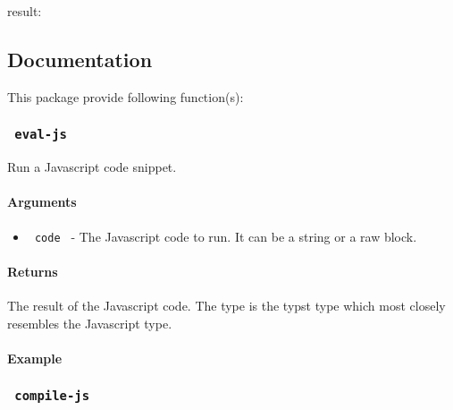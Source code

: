 result:

\pandocbounded{}

\subsection{Documentation}\label{documentation}

This package provide following function(s):

\subsubsection{\texorpdfstring{\texttt{\ eval-js\ }}{ eval-js }}\label{eval-js}

Run a Javascript code snippet.

\paragraph{Arguments}\label{arguments}

\begin{itemize}
\tightlist
\item
  \texttt{\ code\ } - The Javascript code to run. It can be a string or
  a raw block.
\end{itemize}

\paragraph{Returns}\label{returns}

The result of the Javascript code. The type is the typst type which most
closely resembles the Javascript type.

\paragraph{Example}\label{example-1}

\begin{Shaded}
\begin{Highlighting}[]
\end{Highlighting}
\end{Shaded}

\subsubsection{\texorpdfstring{\texttt{\ compile-js\ }}{ compile-js }}\label{compile-js}


